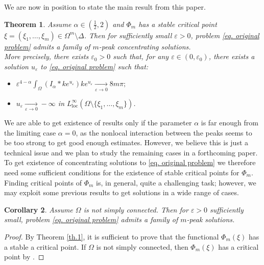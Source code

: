 \documentclass[11pt]{article}
\newtheorem{theorem}{Theorem}[section]
\newtheorem{corollary}[theorem]{Corollary}
\begin{document}
We are now in position to state the main result from this paper.

\begin{theorem}\label{th.1}
Assume $\alpha\in\left(\frac12,2\right)$ and $\Phi_m$ has a stable critical point $\xi=(\xi_1,\dots,\xi_m)\in\Omega^m\setminus\Delta$. Then for sufficiently small $\varepsilon>0$, problem \eqref{eq. original problem} admits a family of $m$-peak concentrating solutions.\\
More precisely, there exists $\varepsilon_0>0$ such that, for any $\varepsilon\in(0,\varepsilon_0)$, there exists a solution $u_\varepsilon$ to \eqref{eq. original problem} such that:
\begin{itemize}
\item $\varepsilon^{4-\alpha}\int_\Omega(I_\alpha\ast ke^{u_\varepsilon})ke^{u_\varepsilon}\underset{\varepsilon\to0}\to8m\pi;$
\item $u_\varepsilon\underset{\varepsilon\to0}\to-\infty$ in $L^\infty_{\mathrm{loc}}(\Omega\setminus\{\xi_1,\dots,\xi_m\})$.
\end{itemize}
\end{theorem}

We are able to get existence of results only if the parameter $\alpha$ is far enough from the limiting case $\alpha=0$, as the nonlocal interaction between the peaks seems to be too strong to get good enough estimates. However, we believe this is just a technical issue and we plan to study the remaining cases in a forthcoming paper.\\

To get existence of concentrating solutions to \eqref{eq. original problem} we therefore need some sufficient conditions for the existence of stable critical points for $\Phi_m$.\\
Finding critical points of $\Phi_m$ is, in general, quite a challenging task; however, we may exploit some previous results to get solutions in a wide range of cases. 

\begin{corollary}
Assume $\Omega$ is not simply connected. Then for $\varepsilon>0$ sufficiently small, problem \eqref{eq. original problem} admits a family of $m$-peak solutions.
\end{corollary}

\begin{proof}
By Theorem \eqref{th.1}, it is sufficient to prove that the functional $\Phi_m(\xi)$ has a stable a critical point. If $\Omega$ is not simply connected, then $\Phi_m(\xi)$ has a critical point by \cite[Theorem 1]{dkm}.
\end{proof}\
\end{document}

